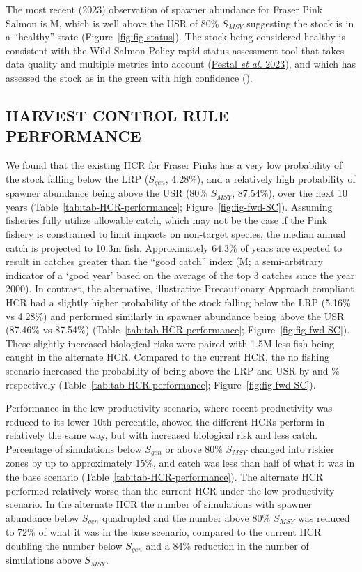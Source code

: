 \documentclass[french,11pt]{book}
\begin{document}
The most recent (2023) observation of spawner abundance for Fraser Pink Salmon is M, which is well above the USR of 80\% \(S_{MSY}\) suggesting the stock is in a ``healthy'' state (Figure~\ref{fig:fig-status}). The stock being considered healthy is consistent with the Wild Salmon Policy rapid status assessment tool that takes data quality and multiple metrics into account (\protect\hyperlink{ref-pestalStateSalmonRapid2023}{Pestal \emph{et al.} 2023}), and which has assessed the stock as in the green with high confidence ().

\hypertarget{harvest-control-rule-performance}{%
\subsection{HARVEST CONTROL RULE PERFORMANCE}\label{harvest-control-rule-performance}}

We found that the existing HCR for Fraser Pinks has a very low probability of the stock falling below the LRP (\(S_{gen}\), 4.28\%), and a relatively high probability of spawner abundance being above the USR (80\% \(S_{MSY}\), 87.54\%), over the next 10 years (Table~\ref{tab:tab-HCR-performance}; Figure~\ref{fig:fig-fwd-SC}). Assuming fisheries fully utilize allowable catch, which may not be the case if the Pink fishery is constrained to limit impacts on non-target species, the median annual catch is projected to 10.3m fish. Approximately 64.3\% of years are expected to result in catches greater than the ``good catch'' index (M; a semi-arbitrary indicator of a `good year' based on the average of the top 3 catches since the year 2000). In contrast, the alternative, illustrative Precautionary Approach compliant HCR had a slightly higher probability of the stock falling below the LRP (5.16\% vs 4.28\%) and performed similarly in spawner abundance being above the USR (87.46\% vs 87.54\%) (Table~\ref{tab:tab-HCR-performance}; Figure~\ref{fig:fig-fwd-SC}). These slightly increased biological risks were paired with 1.5M less fish being caught in the alternate HCR. Compared to the current HCR, the no fishing scenario increased the probability of being above the LRP and USR by  and \% respectively (Table~\ref{tab:tab-HCR-performance}; Figure~\ref{fig:fig-fwd-SC}).

Performance in the low productivity scenario, where recent productivity was reduced to its lower 10th percentile, showed the different HCRs perform in relatively the same way, but with increased biological risk and less catch. Percentage of simulations below \(S_{gen}\) or above 80\% \(S_{MSY}\) changed into riskier zones by up to approximately 15\%, and catch was less than half of what it was in the base scenario (Table~\ref{tab:tab-HCR-performance}). The alternate HCR performed relatively worse than the current HCR under the low productivity scenario. In the alternate HCR the number of simulations with spawner abundance below \(S_{gen}\) quadrupled and the number above 80\% \(S_{MSY}\) was reduced to 72\% of what it was in the base scenario, compared to the current HCR doubling the number below \(S_{gen}\) and a 84\% reduction in the number of simulations above \(S_{MSY}\).
\end{document}
